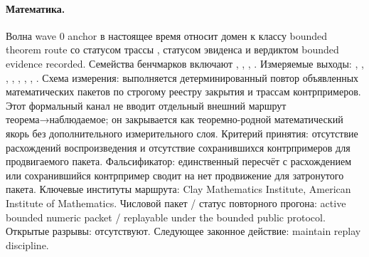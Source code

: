 \paragraph{Математика.}
Волна wave 0 anchor в настоящее время относит домен к классу bounded theorem route со статусом трассы , статусом эвиденса  и вердиктом bounded evidence recorded.
Семейства бенчмарков включают , \allowbreak {}, \allowbreak {}, \allowbreak {}.
Измеряемые выходы: , \allowbreak {}, \allowbreak {}, \allowbreak {}, \allowbreak {}, \allowbreak {}, \allowbreak {}, \allowbreak {}.
Схема измерения: выполняется детерминированный повтор объявленных математических пакетов по строгому реестру закрытия и трассам контрпримеров.
Этот формальный канал не вводит отдельный внешний маршрут теорема→наблюдаемое; он закрывается как теоремно-родной математический якорь без дополнительного измерительного слоя.
Критерий принятия: отсутствие расхождений воспроизведения и отсутствие сохранившихся контрпримеров для продвигаемого пакета.
Фальсификатор: единственный пересчёт с расхождением или сохранившийся контрпример сводит на нет продвижение для затронутого пакета.
Ключевые институты маршрута: Clay Mathematics Institute, \allowbreak American Institute of Mathematics.
Числовой пакет / статус повторного прогона: active bounded numeric packet / replayable under the bounded public protocol.
Открытые разрывы: отсутствуют.
Следующее законное действие: maintain replay discipline.

